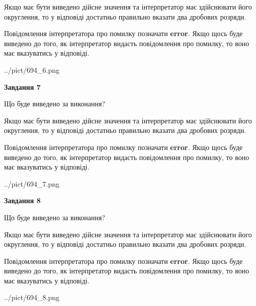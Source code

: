 \documentclass[12pt, ukrainian]{article}
\begin{document}
{\begin {Large}
Якщо має бути виведено дійсне значення та інтерпретатор має здійснювати його округлення, 
то у відповіді достатньо правильно вказати два дробових розряди.

Повідомлення інтерпретатора про помилку позначати \textbf{error}.
Якщо щось буде виведено до того, як інтерпретатор видасть повідомлення про помилку, 
то воно має вказуватись у відповіді. \par

\begin{center}
	{../pict/694_6.png}
\end{center}
\newpage

{\begin {center}\textbf{Завдання 7}\end {center}}\par
Що буде виведено за виконання? \par

Якщо має бути виведено дійсне значення та інтерпретатор має здійснювати його округлення, 
то у відповіді достатньо правильно вказати два дробових розряди.

Повідомлення інтерпретатора про помилку позначати \textbf{error}.
Якщо щось буде виведено до того, як інтерпретатор видасть повідомлення про помилку, 
то воно має вказуватись у відповіді. \par

\begin{center}
	{../pict/694_7.png}
\end{center}
\newpage

{\begin {center}\textbf{Завдання 8}\end {center}}\par
Що буде виведено за виконання? \par

Якщо має бути виведено дійсне значення та інтерпретатор має здійснювати його округлення, 
то у відповіді достатньо правильно вказати два дробових розряди.

Повідомлення інтерпретатора про помилку позначати \textbf{error}.
Якщо щось буде виведено до того, як інтерпретатор видасть повідомлення про помилку, 
то воно має вказуватись у відповіді. \par

\begin{center}
	{../pict/694_8.png}
\end{center}
\newpage


\end{Large}}
\end{document}
